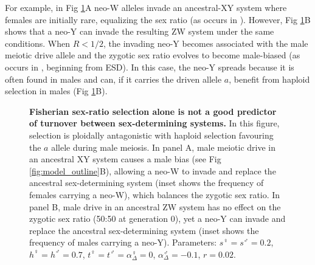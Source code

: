 \documentclass[10pt,letterpaper]{article}
\providecommand{\DIFdelbeginFL}{} %
\providecommand{\DIFdelendFL}{} %
\begin{document}
\noindent For example, in Fig \ref{fig:SexRatioBad}A neo-W alleles invade an ancestral-XY system where females are initially rare, equalizing the sex ratio (as occurs in \cite{Kozielska:2010vm}).
However, Fig \ref{fig:SexRatioBad}B shows that a neo-Y can invade the resulting ZW system under the same conditions. 
When $R<1/2$, the invading neo-Y becomes associated with the male meiotic drive allele and the zygotic sex ratio evolves to become male-biased (as occurs in \cite{Ubeda:2015fx}, beginning from ESD). 
In this case, the neo-Y spreads because it is often found in males and can, if it carries the driven allele $a$, benefit from haploid selection in males (Fig \ref{fig:SexRatioBad}B).

\begin{figure}[!h]
\centering
\DIFdelbeginFL %
\DIFdelendFL %
\caption{
{\bf Fisherian sex-ratio selection alone is not a good predictor of turnover between sex-determining systems.}
In this figure, selection is ploidally antagonistic with haploid selection favouring the $a$ allele during male meiosis.
In panel A, male meiotic drive in an ancestral XY system causes a male bias (see Fig \ref{fig:model_outline}B), allowing a neo-W to invade and replace the ancestral sex-determining system (inset shows the frequency of females carrying a neo-W), which balances the zygotic sex ratio.
In panel B, male drive in an ancestral ZW system has no effect on the zygotic sex ratio (50:50 at generation 0), yet a neo-Y can invade and replace the ancestral sex-determining system (inset shows the frequency of males carrying a neo-Y). 
Parameters:  $s^\female =s^\male = 0.2$, $h^\female = h^\male = 0.7$, $t^\female = t^\male = \alpha^\female_\Delta = 0$, $\alpha^\male_\Delta = -0.1$, $r=0.02$.
}
\label{fig:SexRatioBad}
\end{figure}
\end{document}
